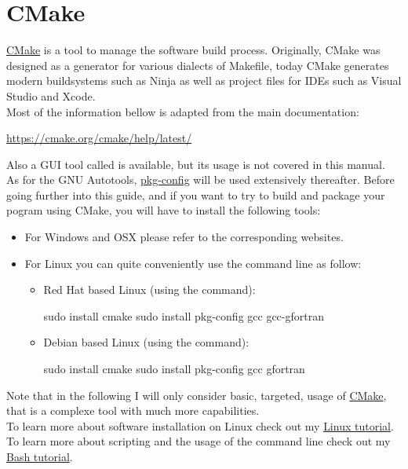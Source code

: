 \section{CMake}

\href{https://cmake.org}{CMake} is a tool to manage the software build process. 
Originally, CMake was designed as a generator for various dialects of Makefile, today CMake generates modern buildsystems such as Ninja as well as project files for IDEs such as Visual Studio and Xcode. \\
Most of the information bellow is adapted from the main documentation: 
\begin{center}\href{https://cmake.org/cmake/help/latest/}{https://cmake.org/cmake/help/latest/} \end{center}
Also a GUI tool called  is available, but its usage is not covered in this manual.  \\
As for the GNU Autotools, \href{https://en.wikipedia.org/wiki/Pkg-config}{pkg-config} will be used extensively thereafter.  
Before going further into this guide, and if you want to try to build and package your pogram using CMake, you will have to install the following tools: 
\begin{itemize}
\item For Windows and OSX please refer to the corresponding websites.
\item For Linux you can quite conveniently use the command line as follow:
\begin{itemize}
\item Red Hat based Linux (using the  command):
\begin{scriptii}
\fprompt{~} sudo  install cmake
\fprompt{~} sudo  install pkg-config gcc gcc-gfortran
\end{scriptii}
\item Debian based Linux (using the  command):
\begin{scriptii}
\fprompt{~} sudo  install cmake
\fprompt{~} sudo  install pkg-config gcc gfortran
\end{scriptii}
\end{itemize}
\end{itemize}
Note that in the following I will only consider basic, targeted, usage of \href{https://cmake.org}{CMake}, that is a complexe tool with much more capabilities. \\
To learn more about software installation on Linux check out my \href{https://www.ipcms.fr/wp-content/uploads/2021/11/linux.pdf}{Linux tutorial}. \\
To learn more about scripting and the usage of the command line check out my \href{https://www.ipcms.fr/wp-content/uploads/2021/05/bash.pdf}{Bash tutorial}.

